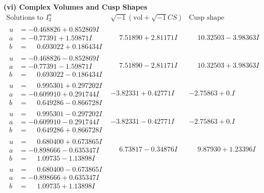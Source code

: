 \documentclass[1p]{elsarticle_modified}
\theoremstyle{definition}
\newcommand{\I}{\sqrt{-1}}
\begin{document}
\newpage\flushleft \textbf{(vi) Complex Volumes and Cusp Shapes}
$$\begin{array}{c|c|c}  
\text{Solutions to }I^u_{2}& \I (\text{vol} + \sqrt{-1}CS) & \text{Cusp shape}\\
 \hline 
\begin{aligned}
u &= -0.468826 + 0.852869 I \\
a &= -0.77391 + 1.59871 I \\
b &= \phantom{-}0.693022 + 0.186434 I\end{aligned}
 & \phantom{-}7.51890 + 2.81171 I & \phantom{-}10.32503 - 3.98363 I \\ \hline\begin{aligned}
u &= -0.468826 - 0.852869 I \\
a &= -0.77391 - 1.59871 I \\
b &= \phantom{-}0.693022 - 0.186434 I\end{aligned}
 & \phantom{-}7.51890 - 2.81171 I & \phantom{-}10.32503 + 3.98363 I \\ \hline\begin{aligned}
u &= \phantom{-}0.995301 + 0.297202 I \\
a &= -0.609910 + 0.291744 I \\
b &= \phantom{-}0.649286 - 0.866728 I\end{aligned}
 & -3.82331 + 0.42771 I & -2.75863 + 0. I\phantom{ +0.000000I} \\ \hline\begin{aligned}
u &= \phantom{-}0.995301 - 0.297202 I \\
a &= -0.609910 - 0.291744 I \\
b &= \phantom{-}0.649286 + 0.866728 I\end{aligned}
 & -3.82331 - 0.42771 I & -2.75863 + 0. I\phantom{ +0.000000I} \\ \hline\begin{aligned}
u &= \phantom{-}0.680400 + 0.673865 I \\
a &= -0.898666 - 0.635347 I \\
b &= \phantom{-}1.09735 - 1.13898 I\end{aligned}
 & \phantom{-}6.73817 - 0.34876 I & \phantom{-}9.87930 + 1.23396 I \\ \hline\begin{aligned}
u &= \phantom{-}0.680400 - 0.673865 I \\
a &= -0.898666 + 0.635347 I \\
b &= \phantom{-}1.09735 + 1.13898 I\end{aligned}

\end{array}$$
\end{document}
